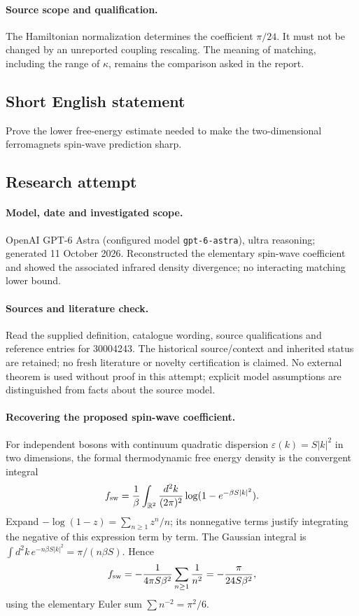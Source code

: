 \documentclass[11pt]{article}
\begin{document}
\paragraph{Source scope and qualification.}
The Hamiltonian normalization determines the coefficient $\pi/24$. It must not be changed by an unreported coupling rescaling. The meaning of matching, including the range of $\kappa$, remains the comparison asked in the report.
\subsection{Short English statement}
Prove the lower free-energy estimate needed to make the two-dimensional ferromagnet\textquotesingle s spin-wave prediction sharp.
\subsection{Research attempt}
\paragraph{Model, date and investigated scope.}
OpenAI GPT-6 Astra (configured model \texttt{gpt-6-astra}), ultra reasoning; generated 11 October 2026. Reconstructed the elementary spin-wave coefficient and showed the associated infrared density divergence; no interacting matching lower bound.

\paragraph{Sources and literature check.}
Read the supplied definition, catalogue wording, source qualifications and reference entries for 30004243. The historical source/context and inherited status are retained; no fresh literature or novelty certification is claimed. No external theorem is used without proof in this attempt; explicit model assumptions are distinguished from facts about the source model.

\paragraph{Recovering the proposed spin-wave coefficient.} For independent bosons with continuum quadratic dispersion \(\varepsilon(k)=S|k|^2\) in two dimensions, the formal thermodynamic free energy density is the convergent integral
\[
 f_{\rm sw}=\frac1\beta\int_{\mathbb R^2}\frac{d^2k}{(2\pi)^2}\log(1-e^{-\beta S|k|^2}).
\]
Expand \(-\log(1-z)=\sum_{n\ge1}z^n/n\); its nonnegative terms justify integrating the negative of this expression term by term. The Gaussian integral is \(\int d^2k\,e^{-n\beta S|k|^2}=\pi/(n\beta S)\). Hence
\[
 f_{\rm sw}=-\frac1{4\pi S\beta^2}\sum_{n\ge1}\frac1{n^2}=-\frac\pi{24S\beta^2},
\]
using the elementary Euler sum \(\sum n^{-2}=\pi^2/6\).
\end{document}

